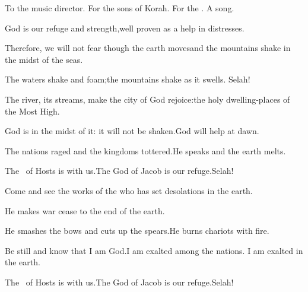 
\begin{inparaenum}
  \noindent{} To the music director. For the sons of Korah. For the . A song.\smallskip%
  
  \pb {} God is our refuge and strength,\pa well proven as a help in distresses.%
  
  \pb {} Therefore, we will not fear though the earth moves\pa and the mountains shake in the midst of the seas.%
  
  \pb {} The waters shake and foam;\pa the mountains shake as it swells.%
  \pa Selah!%
  
  \pc {} The river,%
  its streams, make%
  the city of God rejoice:\pa the holy dwelling-places of the Most High.%
  
  \pb {} God is in the midst of it: it will not be shaken.\pa God will help at dawn.%
  
  \pb {} The nations raged and the kingdoms tottered.\pa He speaks and the earth melts.%
  
  \pb {} The \lord\ of Hosts is with us.\pa The God of Jacob is our refuge.\pa Selah!%
  
  \pc {} Come and see the works of the \lord%
  \pa who has set desolations in the earth.%
  
  \pb {} He makes war cease to the end of the earth.%
  
  \pc He smashes the bows and cuts up the spears.\pa He burns chariots%
  with fire.%
  
  \pb {} Be still and know that I am God.\pa I am exalted among the nations. I am exalted in the earth.%
  
  \pb {} The \lord\ of Hosts is with us.\pa The God of Jacob is our refuge.\pa Selah!%
\end{inparaenum}

